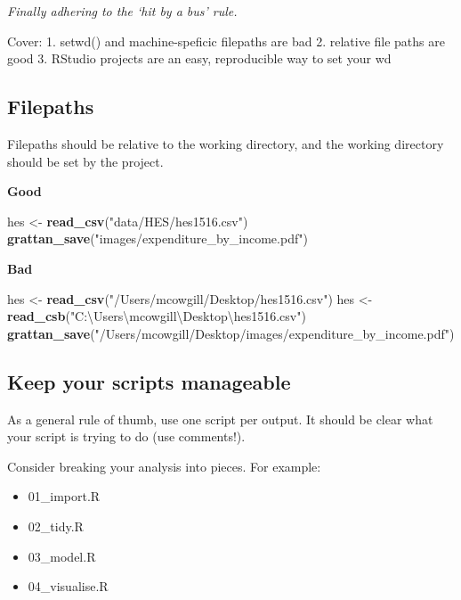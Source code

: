 \documentclass[]{book}
\newenvironment{Shaded}{\begin{snugshade}}{\end{snugshade}}
\newcommand{\KeywordTok}[1]{\textcolor[rgb]{0.13,0.29,0.53}{\textbf{#1}}}
\newcommand{\NormalTok}[1]{#1}
\newcommand{\StringTok}[1]{\textcolor[rgb]{0.31,0.60,0.02}{#1}}
\providecommand{\tightlist}{%
  \setlength{\itemsep}{0pt}\setlength{\parskip}{0pt}}
\begin{document}
\emph{Finally adhering to the `hit by a bus' rule.}

Cover:
1. setwd() and machine-speficic filepaths are bad
2. relative file paths are good
3. RStudio projects are an easy, reproducible way to set your wd

\hypertarget{filepaths}{%
\subsection{Filepaths}\label{filepaths}}

Filepaths should be relative to the working directory, and the working directory should be set by the project.

\textbf{Good}

\begin{Shaded}
\begin{Highlighting}[]
\NormalTok{hes <-}\StringTok{ }\KeywordTok{read_csv}\NormalTok{(}\StringTok{"data/HES/hes1516.csv"}\NormalTok{)}
\KeywordTok{grattan_save}\NormalTok{(}\StringTok{"images/expenditure_by_income.pdf"}\NormalTok{)}
\end{Highlighting}
\end{Shaded}

\textbf{Bad}

\begin{Shaded}
\begin{Highlighting}[]
\NormalTok{hes <-}\StringTok{ }\KeywordTok{read_csv}\NormalTok{(}\StringTok{"/Users/mcowgill/Desktop/hes1516.csv"}\NormalTok{)}
\NormalTok{hes <-}\StringTok{ }\KeywordTok{read_csb}\NormalTok{(}\StringTok{"C:\textbackslash{}Users\textbackslash{}mcowgill\textbackslash{}Desktop\textbackslash{}hes1516.csv"}\NormalTok{)}
\KeywordTok{grattan_save}\NormalTok{(}\StringTok{"/Users/mcowgill/Desktop/images/expenditure_by_income.pdf"}\NormalTok{)}
\end{Highlighting}
\end{Shaded}

\hypertarget{keep-your-scripts-manageable}{%
\subsection{Keep your scripts manageable}\label{keep-your-scripts-manageable}}

As a general rule of thumb, use one script per output. It should be clear what your script is trying to do (use comments!).

Consider breaking your analysis into pieces. For example:

\begin{itemize}
\tightlist
\item
  01\_import.R
\item
  02\_tidy.R
\item
  03\_model.R
\item
  04\_visualise.R
\end{itemize}
\end{document}
